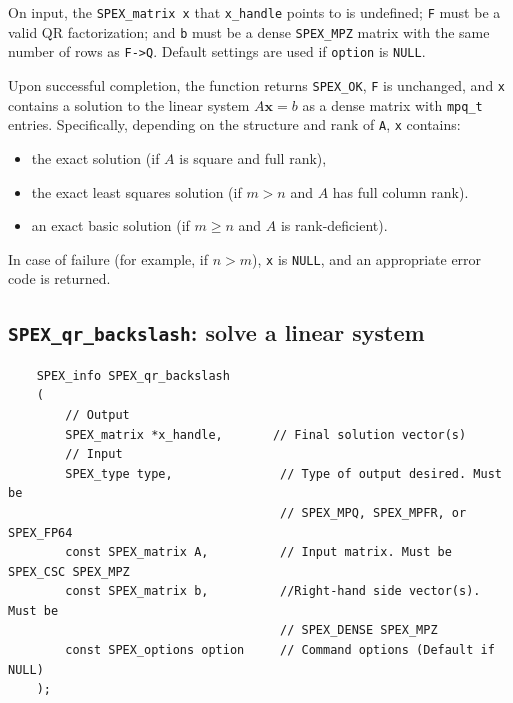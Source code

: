 \documentclass[12pt,oneside]{book}
\theoremstyle{definition}
\newcommand{\x}{\mathbf{x}}
\begin{document}
On input, the \verb|SPEX_matrix x| that \verb|x_handle| points to is undefined; \verb|F| must be a valid QR factorization; and \verb|b| must be a dense \verb|SPEX_MPZ| matrix with the same number of rows as \verb|F->Q|. Default settings are used if \verb|option| is \verb|NULL|.

Upon successful completion, the function returns \verb|SPEX_OK|, \verb|F| is unchanged,  and \verb|x| contains a solution to the linear system $A \x = b$ as a dense matrix with \verb|mpq_t| entries. Specifically, depending on the structure and rank of \verb|A|, \verb|x| contains:
\begin{itemize}
\item
    the exact solution (if $A$ is square and full rank),
\item 
    the exact least squares solution (if $m > n$ and $A$ has full column rank).
\item
    an exact basic solution (if $m \geq n$ and $A$ is rank-deficient).
\end{itemize}

In case of failure (for example, if $n > m$), \verb|x| is \verb|NULL|, and an appropriate error code is returned.

\subsection{\texttt{SPEX\_qr\_backslash}: solve a linear system}
\label{ss:SPEX_qr_backslash}
\begin{mdframed}[userdefinedwidth=\textwidth]
{\footnotesize
\begin{verbatim}
    SPEX_info SPEX_qr_backslash
    (
        // Output
        SPEX_matrix *x_handle,       // Final solution vector(s)
        // Input
        SPEX_type type,               // Type of output desired. Must be
                                      // SPEX_MPQ, SPEX_MPFR, or SPEX_FP64
        const SPEX_matrix A,          // Input matrix. Must be SPEX_CSC SPEX_MPZ
        const SPEX_matrix b,          //Right-hand side vector(s). Must be
                                      // SPEX_DENSE SPEX_MPZ 
        const SPEX_options option     // Command options (Default if NULL)
    );
\end{verbatim}
} \end{mdframed}
\end{document}
